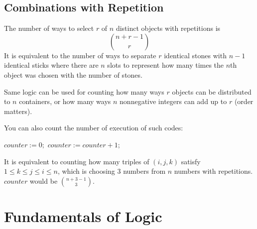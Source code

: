 \documentclass[12pt]{article}
\begin{document}
\subsection{Combinations with Repetition}
The number of ways to select $r$ of $n$ distinct objects with repetitions is
\[
\binom{n+r-1}{r}
\]
It is equivalent to the number of ways to separate $r$ identical stones with $n-1$ identical sticks where there are $n$ slots to represent how many times the $n$th object was chosen with the number of stones. 

Same logic can be used for counting how many ways $r$ objects can be distributed to $n$ containers, or how many ways $n$ nonnegative integers can add up to $r$ (order matters).

You can also count the number of execution of such codes:
\begin{algorithmic}
\State $counter := 0;$
\State $counter := counter + 1;$
\end{algorithmic}
It is equivalent to counting how many triples of $(i, j, k)$ satisfy $1 \leq k \leq j \leq i \leq n$, which is choosing 3 numbers from $n$ numbers with repetitions. $counter$ would be $\displaystyle \binom{n+3-1}{3}$.
\pagebreak
\section{Fundamentals of Logic}
\end{document}
